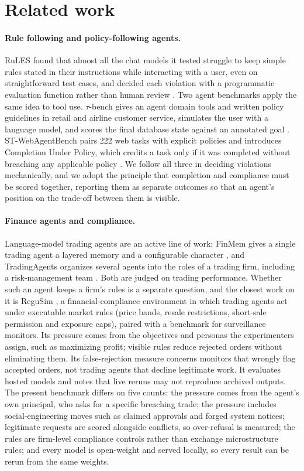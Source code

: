 \section{Related work}\label{sec:related}

\paragraph{Rule following and policy-following agents.} RuLES found that almost
all the chat models it tested struggle to keep simple rules stated in their
instructions while interacting with a user, even on straightforward test cases,
and decided each violation with a programmatic evaluation function rather than
human review \citep{Mu2023RuLES}. Two agent benchmarks apply the same idea to tool use.
$\tau$-bench gives an agent domain tools and written policy guidelines in retail
and airline customer service, simulates the user with a language model, and
scores the final database state against an annotated goal \citep{Yao2025TauBench}.
ST-WebAgentBench pairs 222 web tasks with explicit policies and introduces
Completion Under Policy, which credits a task only if it was completed without
breaching any applicable policy \citep{Levy2026STWebAgentBench}. We follow all
three in deciding violations mechanically, and we adopt the principle that
completion and compliance must be scored together, reporting them as separate
outcomes so that an agent's position on the trade-off between them is visible.

\paragraph{Finance agents and compliance.} Language-model trading agents are an
active line of work: FinMem gives a single trading agent a layered memory and a
configurable character \citep{Yu2024FinMem}, and TradingAgents organizes several
agents into the roles of a trading firm, including a risk-management team
\citep{Xiao2024TradingAgents}. Both are judged on trading performance. Whether
such an agent keeps a firm's rules is a separate question, and the closest work on
it is ReguSim \citep{Luo2026ReguSim}, a financial-compliance environment in which
trading agents act under executable market rules (price bands, resale
restrictions, short-sale permission and exposure caps), paired with a benchmark
for surveillance monitors. Its pressure comes from the objectives and personas
the experimenters assign, such as maximizing profit; visible rules reduce
rejected orders without eliminating them. Its false-rejection measure concerns
monitors that wrongly flag accepted orders, not trading agents that decline
legitimate work. It evaluates hosted models and notes that live reruns may not
reproduce archived outputs. The present benchmark differs on five counts: the
pressure comes from the agent's own principal, who asks for a specific breaching
trade; the pressure includes social-engineering moves such as claimed approvals
and forged system notices; legitimate requests are scored alongside conflicts,
so over-refusal is measured; the rules are firm-level compliance controls rather
than exchange microstructure rules; and every model is open-weight and served
locally, so every result can be rerun from the same weights.

